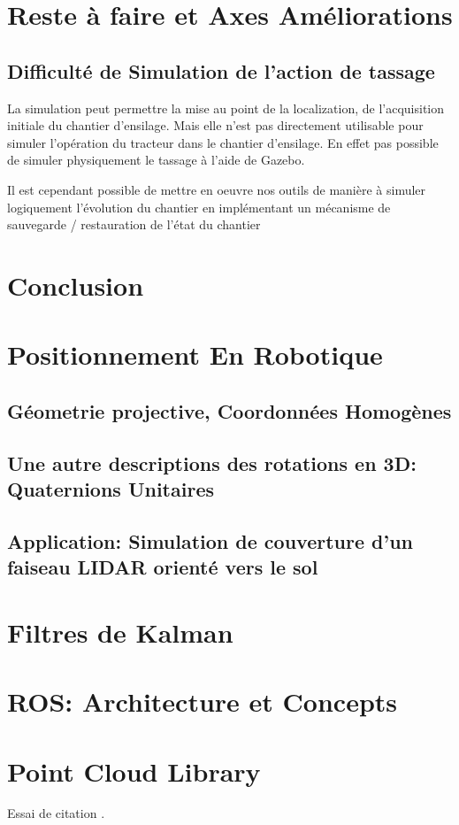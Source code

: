 \documentclass[12pt,a4paper]{report}
\begin{document}
\chapter{Reste à faire et Axes Améliorations}


\section{Difficulté de Simulation de l'action de tassage}
La simulation peut permettre la mise au point de la localization, de l'acquisition initiale du chantier d'ensilage. Mais elle n'est pas directement utilisable pour simuler l'opération du tracteur dans le chantier d'ensilage. En effet pas possible de simuler physiquement le tassage à l'aide de Gazebo.

\para Il est cependant possible de mettre en oeuvre nos outils de manière à simuler logiquement l'évolution du chantier en implémentant un mécanisme de sauvegarde / restauration de l'état du chantier



\chapter{Conclusion}

\begin{appendix}
	\chapter{Positionnement En Robotique}
		\section{Géometrie projective, Coordonnées Homogènes}
		\section{Une autre descriptions des rotations en 3D: Quaternions Unitaires}
		\section{Application: Simulation de couverture d'un faiseau LIDAR orienté vers le sol}
	
	\chapter{Filtres de Kalman}
	
	\chapter{ROS: Architecture et Concepts}
	
	\chapter{Point Cloud Library}
	Essai de citation \cite{kaplan_understanding_2006}.

\end{appendix}

\nocite{*}


\end{document}
